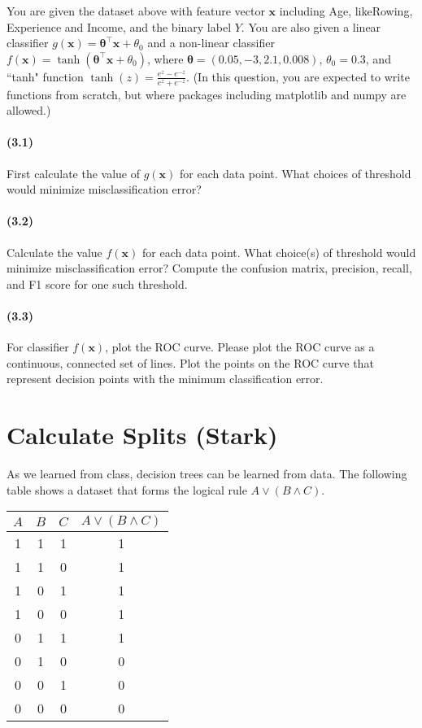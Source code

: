 \documentclass{exam}
\begin{document}
You are given the dataset above with feature vector $\mathbf{x}$ including Age, likeRowing, Experience and Income, and the binary label $Y$. You are also given a linear classifier $g(\mathbf{x}) = \bm\theta^\top \mathbf{x} + \theta_0$ and a non-linear classifier $f(\mathbf{x})=\tanh(\bm\theta^\top \mathbf{x} + \theta_0)$, where $\bm\theta=(0.05,-3, 2.1, 0.008)$,  $\theta_0=0.3$, and ``tanh" function $\tanh(z)=\frac{e^z - e^{-z}}{e^z + e^{-z}}$.  (In this question, you are expected to write functions from scratch, but where packages including matplotlib and numpy are allowed.)

\paragraph{(3.1)} First calculate the value of $g(\mathbf{x})$ for each data point. What choices of threshold would minimize misclassification error? 

\paragraph{(3.2)} Calculate the value $f(\mathbf{x})$ for each data point. What choice(s) of threshold would minimize misclassification error? Compute the confusion matrix, precision, recall, and F1 score for one such threshold.

\paragraph{(3.3)} For classifier $f(\mathbf{x})$, plot the ROC curve. Please plot the ROC curve as a continuous, connected set of lines. Plot the points on the ROC curve that represent  decision points with the minimum classification error.

\section{Calculate Splits (Stark)}

As we learned from class, decision trees can be learned from data. The following table shows a dataset that forms the logical rule $A \vee (B \wedge C)$.
\begin{center}
\begin{tabular}[c]{c|c|c||c}
$A$ & $B$ & $C$ & $A \vee (B \wedge C)$ \\ \hline
1 & 1 & 1 & 1 \\
1 & 1 & 0 & 1 \\
1 & 0 & 1 & 1 \\
1 & 0 & 0 & 1 \\
0 & 1 & 1 & 1 \\
0 & 1 & 0 & 0 \\
0 & 0 & 1 & 0 \\
0 & 0 & 0 & 0 \\
\end{tabular}
\end{center}
\end{document}
